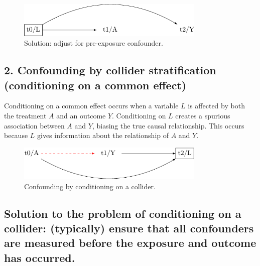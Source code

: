 \documentclass[
  singlecolumn]{report}
\begin{document}
\begin{figure}

{\centering \includegraphics[width=0.8\textwidth,height=\textheight]{causal-dags_files/figure-pdf/fig-dag-common-cause-solution-1.pdf}

}

\caption{\label{fig-dag-common-cause-solution}Solution: adjust for
pre-exposure confounder.}

\end{figure}

\hypertarget{confounding-by-collider-stratification-conditioning-on-a-common-effect}{%
\subsection{2. Confounding by collider stratification (conditioning on a
common
effect)}\label{confounding-by-collider-stratification-conditioning-on-a-common-effect}}

Conditioning on a common effect occurs when a variable \(L\) is affected
by both the treatment \(A\) and an outcome \(Y\). Conditioning on \(L\)
creates a spurious association between \(A\) and \(Y\), biasing the true
causal relationship. This occurs because \(L\) gives information about
the relationship of \(A\) and \(Y\).

\begin{figure}

{\centering \includegraphics[width=0.8\textwidth,height=\textheight]{causal-dags_files/figure-pdf/fig-dag-common-effect-1.pdf}

}

\caption{\label{fig-dag-common-effect}Confounding by conditioning on a
collider.}

\end{figure}

\hypertarget{solution-to-the-problem-of-conditioning-on-a-collider-typically-ensure-that-all-confounders-are-measured-before-the-exposure-and-outcome-has-occurred.}{%
\subsection{Solution to the problem of conditioning on a collider:
(typically) ensure that all confounders are measured before the exposure
and outcome has
occurred.}\label{solution-to-the-problem-of-conditioning-on-a-collider-typically-ensure-that-all-confounders-are-measured-before-the-exposure-and-outcome-has-occurred.}}
\end{document}
